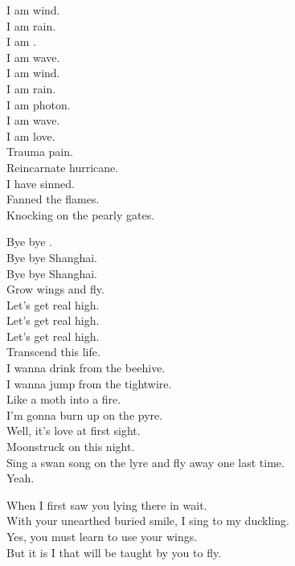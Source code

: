 
I am wind. \\
I am rain. \\
I am . \\
I am wave. \\
I am wind. \\
I am rain. \\
I am photon. \\
I am wave. \\
I am love. \\
Trauma pain. \\
Reincarnate hurricane. \\
I have sinned. \\
Fanned the flames. \\
Knocking on the pearly gates. \\





Bye bye . \\
Bye bye Shanghai. \\
Bye bye Shanghai. \\
Grow wings and fly. \\
Let's get real high. \\
Let's get real high. \\
Let's get real high. \\
Transcend this life. \\

I wanna drink from the beehive. \\
I wanna jump from the tightwire. \\
Like a moth into a fire. \\
I'm gonna burn up on the pyre. \\
Well, it's love at first sight. \\
Moonstruck on this night. \\
Sing a swan song on the lyre and fly away one last time. \\
Yeah. \\


When I first saw you lying there in wait. \\
With your unearthed buried smile, I sing to my duckling. \\
Yes, you must learn to use your wings. \\
But it is I that will be taught by you to fly. \\

